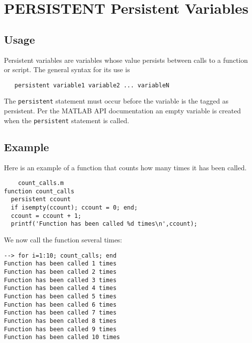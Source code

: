 \section{PERSISTENT Persistent Variables}

\subsection{Usage}

Persistent variables are variables whose value persists between
calls to a function or script.  The general syntax for its
use is
\begin{verbatim}
   persistent variable1 variable2 ... variableN
\end{verbatim}
The \verb|persistent| statement must occur before the variable
is the tagged as persistent.  Per the MATLAB API documentation
an empty variable is created when the \verb|persistent| statement
is called.
\subsection{Example}

Here is an example of a function that counts how many
times it has been called.
\begin{verbatim}
    count_calls.m
function count_calls
  persistent ccount
  if isempty(ccount); ccount = 0; end;
  ccount = ccount + 1;
  printf('Function has been called %d times\n',ccount);
\end{verbatim}
We now call the function several times:
\begin{verbatim}
--> for i=1:10; count_calls; end
Function has been called 1 times
Function has been called 2 times
Function has been called 3 times
Function has been called 4 times
Function has been called 5 times
Function has been called 6 times
Function has been called 7 times
Function has been called 8 times
Function has been called 9 times
Function has been called 10 times
\end{verbatim}
